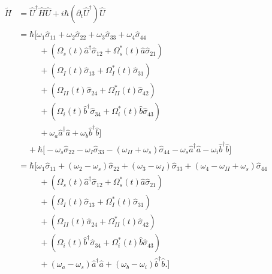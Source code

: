 \documentclass[aps,pra,showpacs,amsmath,amssymb,nofootinbib,longbibliography,superscriptaddress
]{revtex4-1}
\theoremstyle{definition}
\theoremstyle{remark}
\newcommand{\0}{\hat{0}}
\begin{document}
\begin{align}
    \tilde{H}
    &=
    \hat{U}^{\dagger} \hat{H} \hat{U} + i \hbar (\partial_t \hat{U}^{\dagger}) \hat{U} \nonumber \\ \nonumber \\
    &=
    \hbar \biggl[
        \omega_1 \hat{\sigma}_{11} +
        \omega_2 \hat{\sigma}_{22} +
        \omega_3 \hat{\sigma}_{33} +
        \omega_4 \hat{\sigma}_{44} \nonumber \\
        &\;\;\;\;\;\;\;\;\;+
        \left(
            \Omega_{s}(t) \hat{a}^{\dagger} \hat{\sigma}_{12} +
            \Omega_{s}^*(t) \hat{a} \hat{\sigma}_{21}
        \right) \nonumber \\
        &\;\;\;\;\;\;\;\;\;+
        \left(
            \Omega_{I}(t) \hat{\sigma}_{13} +
            \Omega_{I}^*(t) \hat{\sigma}_{31}
        \right)\nonumber \\
        &\;\;\;\;\;\;\;\;\;+
        \left(
            \Omega_{II}(t) \hat{\sigma}_{24} +
            \Omega_{II}^*(t) \hat{\sigma}_{42}
        \right) \nonumber \\
        &\;\;\;\;\;\;\;\;\;+
        \left(
            \Omega_{i}(t) \hat{b}^{\dagger} \hat{\sigma}_{34} +
            \Omega_{i}^*(t) \hat{b} \hat{\sigma}_{43}
        \right) \nonumber \\
        &\;\;\;\;\;\;\;\;\;+
        \omega_{a} \hat{a}^{\dagger}\hat{a} +
        \omega_{b} \hat{b}^{\dagger}\hat{b}
    \biggr]\nonumber \\
    &\;\;\;\;+
    \hbar \biggl[
        -\omega_s \hat{\sigma}_{22} -
        \omega_I \hat{\sigma}_{33} -
        (\omega_{II} + \omega_s) \hat{\sigma}_{44} -
        \omega_s \hat{a}^{\dagger} \hat{a} -
        \omega_i \hat{b}^{\dagger} \hat{b}
    \biggr] \nonumber\\ \nonumber \\
    &=
    \hbar \biggl[
        \omega_1 \hat{\sigma}_{11} +
        (\omega_2 - \omega_s) \hat{\sigma}_{22} +
        (\omega_3 - \omega_I) \hat{\sigma}_{33} +
        (\omega_4 - \omega_{II} + \omega_s) \hat{\sigma}_{44} \nonumber \\
        &\;\;\;\;\;\;\;\;\;+
        \left(
            \Omega_{s}(t) \hat{a}^{\dagger} \hat{\sigma}_{12} +
            \Omega_{s}^*(t) \hat{a} \hat{\sigma}_{21}
        \right) \nonumber \\
        &\;\;\;\;\;\;\;\;\;+
        \left(
            \Omega_{I}(t) \hat{\sigma}_{13} +
            \Omega_{I}^*(t) \hat{\sigma}_{31}
        \right)\nonumber \\
        &\;\;\;\;\;\;\;\;\;+ 
        \left(
            \Omega_{II}(t) \hat{\sigma}_{24} +
            \Omega_{II}^*(t) \hat{\sigma}_{42}
        \right) \nonumber \\
        &\;\;\;\;\;\;\;\;\;+
        \left(
            \Omega_{i}(t) \hat{b}^{\dagger} \hat{\sigma}_{34} +
            \Omega_{i}^*(t) \hat{b} \hat{\sigma}_{43}
        \right) \nonumber \\
        &\;\;\;\;\;\;\;\;\;+
        (\omega_{a} - \omega_s) \hat{a}^{\dagger}\hat{a} +
        (\omega_{b} - \omega_i) \hat{b}^{\dagger}\hat{b}.
    \biggr]
\end{align}
\end{document}

